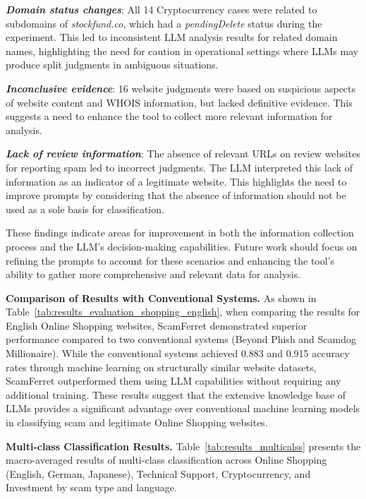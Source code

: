 \documentclass[runningheads]{llncs}
\begin{document}
\noindent\textbf{\textit{Domain status changes}}:
All 14 Cryptocurrency cases were related to subdomains of \textit{stockfund.co}, which had a \textit{pendingDelete} status during the experiment.
This led to inconsistent LLM analysis results for related domain names, highlighting the need for caution in operational settings where LLMs may produce split judgments in ambiguous situations.

\noindent\textbf{\textit{Inconclusive evidence}}:
16 website judgments were based on suspicious aspects of website content and WHOIS information, but lacked definitive evidence.
This suggests a need to enhance the tool to collect more relevant information for analysis.

\noindent\textbf{\textit{Lack of review information}}:
The absence of relevant URLs on review websites for reporting spam led to incorrect judgments.
The LLM interpreted this lack of information as an indicator of a legitimate website.
This highlights the need to improve prompts by considering that the absence of information should not be used as a sole basis for classification.

These findings indicate areas for improvement in both the information collection process and the LLM's decision-making capabilities.
Future work should focus on refining the prompts to account for these scenarios and enhancing the tool's ability to gather more comprehensive and relevant data for analysis.

\noindent\textbf{Comparison of Results with Conventional Systems.}
As shown in Table~\ref{tab:results_evaluation_shopping_english}, when comparing the results for English Online Shopping websites, ScamFerret demonstrated superior performance compared to two conventional systems (Beyond Phish and Scamdog Millionaire).
While the conventional systems achieved 0.883 and 0.915 accuracy rates through machine learning on structurally similar website datasets, ScamFerret outperformed them using LLM capabilities without requiring any additional training.
These results suggest that the extensive knowledge base of LLMs provides a significant advantage over conventional machine learning models in classifying scam and legitimate Online Shopping websites.

\noindent\textbf{Multi-class Classification Results.}
Table~\ref{tab:results_multicalss} presents the macro-averaged results of multi-class classification across Online Shopping (English, German, Japanese), Technical Support, Cryptocurrency, and Investment by scam type and language.
\end{document}
